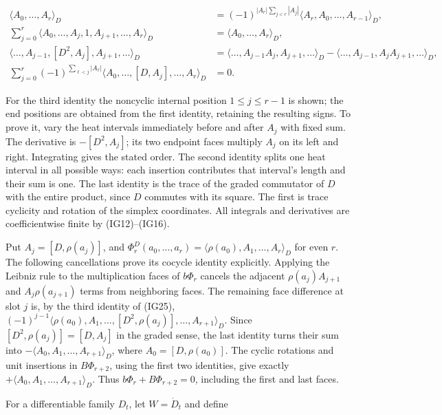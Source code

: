 \documentclass[
  11pt,
]{article}
\begin{document}
\[
\begin{split}
 \langle A_0,\ldots,A_r\rangle_D
 &=(-1)^{|A_r|\sum_{j<r}|A_j|}
                         \langle A_r,A_0,\ldots,A_{r-1}\rangle_D,\\
 \sum_{j=0}^{r}\langle A_0,\ldots,A_j,1,A_{j+1},\ldots,A_r\rangle_D
 &=\langle A_0,\ldots,A_r\rangle_D,\\
 \langle\ldots,A_{j-1},[D^2,A_j],A_{j+1},\ldots\rangle_D
 &=\langle\ldots,A_{j-1}A_j,A_{j+1},\ldots\rangle_D
   -\langle\ldots,A_{j-1},A_jA_{j+1},\ldots\rangle_D,\\
 \sum_{j=0}^r(-1)^{\sum_{\ell<j}|A_\ell|}
 \langle A_0,\ldots,[D,A_j],\ldots,A_r\rangle_D&=0.
\end{split}
\tag{IG25}
\]

For the third identity the noncyclic internal position
\(1\leq j\leq r-1\) is shown; the end positions are obtained from the
first identity, retaining the resulting signs. To prove it, vary the
heat intervals immediately before and after \(A_j\) with fixed sum. The
derivative is \(-[D^2,A_j]\); its two endpoint faces multiply \(A_j\) on
its left and right. Integrating gives the stated order. The second
identity splits one heat interval in all possible ways: each insertion
contributes that interval's length and their sum is one. The last
identity is the trace of the graded commutator of \(D\) with the entire
product, since \(D\) commutes with its square. The first is trace
cyclicity and rotation of the simplex coordinates. All integrals and
derivatives are coefficientwise finite by (IG12)--(IG16).

Put \(A_j=[D,\rho(a_j)]\), and
\(\Phi_r^D(a_0,\ldots,a_r)=\langle\rho(a_0),A_1,\ldots,A_r\rangle_D\)
for even \(r\). The following cancellations prove its cocycle identity
explicitly. Applying the Leibniz rule to the multiplication faces of
\(b\Phi_r\) cancels the adjacent \(\rho(a_j)A_{j+1}\) and
\(A_j\rho(a_{j+1})\) terms from neighboring faces. The remaining face
difference at slot \(j\) is, by the third identity of (IG25),
\((-1)^{j-1}\langle\rho(a_0),A_1,\ldots,[D^2,\rho(a_j)],\ldots,A_{r+1}\rangle_D\).
Since \([D^2,\rho(a_j)]=[D,A_j]\) in the graded sense, the last identity
turns their sum into \(-\langle A_0,A_1,\ldots,A_{r+1}\rangle_D\), where
\(A_0=[D,\rho(a_0)]\). The cyclic rotations and unit insertions in
\(B\Phi_{r+2}\), using the first two identities, give exactly
\(+\langle A_0,A_1,\ldots,A_{r+1}\rangle_D\). Thus
\(b\Phi_r+B\Phi_{r+2}=0\), including the first and last faces.

For a differentiable family \(D_t\), let \(W=\dot D_t\) and define
\end{document}
